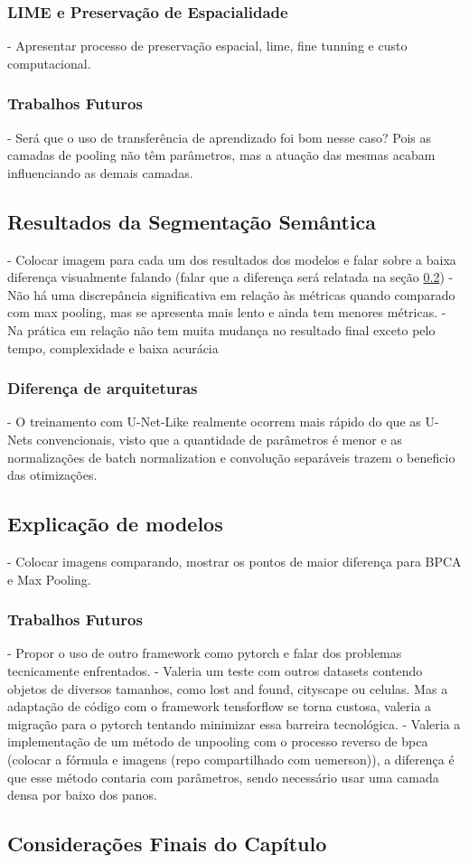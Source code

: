 \subsubsection{LIME e Preservação de Espacialidade}
\label{results:class:lime}
- Apresentar processo de preservação espacial, lime, fine tunning e custo computacional.

\subsubsection{Trabalhos Futuros}
\label{results:class:future}
- Será que o uso de transferência de aprendizado foi bom nesse caso? Pois as camadas de pooling não têm parâmetros, mas a atuação das mesmas acabam influenciando as demais camadas.


\subsection{Resultados da Segmentação Semântica}
\label{results:semantic}
- Colocar imagem para cada um dos resultados dos modelos e falar sobre a baixa diferença visualmente falando (falar que a diferença será relatada na seção \ref{results:semantic:xai})
- Não há uma discrepância significativa em relação às métricas quando comparado com max pooling, mas se apresenta mais lento e ainda tem menores métricas.
- Na prática em relação não tem muita mudança no resultado final exceto pelo tempo, complexidade e baixa acurácia

\subsubsection{Diferença de arquiteturas}
\label{results:semantic:arch}
- O treinamento com U-Net-Like realmente ocorrem mais rápido do que as U-Nets convencionais, visto que a quantidade de parâmetros é menor e as normalizações de batch normalization e convolução separáveis trazem o beneficio das otimizações.

\subsection{Explicação de modelos}
\label{results:semantic:xai}
- Colocar imagens comparando, mostrar os pontos de maior diferença para BPCA e Max Pooling.

\subsubsection{Trabalhos Futuros}
\label{results:semantic:future}
- Propor o uso de outro framework como pytorch e falar dos problemas tecnicamente enfrentados.
- Valeria um teste com outros datasets contendo objetos de diversos tamanhos, como lost and found, cityscape ou celulas. Mas a adaptação de código com o framework tensforflow se torna custosa, valeria a migração para o pytorch tentando minimizar essa barreira tecnológica.
- Valeria a implementação de um método de unpooling com o processo reverso de bpca (colocar a fórmula e imagens (repo compartilhado com uemerson)), a diferença é que esse método contaria com parâmetros, sendo necessário usar uma camada densa por baixo dos panos.


\subsection{Considerações Finais do Capítulo}
\label{result:final}
